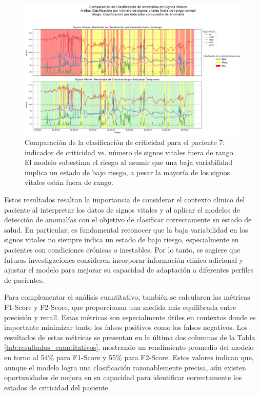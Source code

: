 \begin{figure}[H]
  \centering
  \includegraphics[width=\textwidth]{Images/comparacion_indicador_con_fuera_de_rango_paciente_7.png}
  \caption{Comparación de la clasificación de criticidad para el paciente 7: indicador de criticidad vs. número de signos vitales fuera de rango. El modelo subestima el riesgo al asumir que una baja variabilidad implica un estado de bajo riesgo, a pesar la mayoría de los signos vitales están fuera de rango.}

  \label{fig:comparacion_clasificacion_paciente7}
\end{figure}

Estos resultados resaltan la importancia de considerar el contexto clinico del paciente al interpretar los datos de signos vitales y al aplicar el modelos de detección de anomalías con el objetivo de clasificar correctamente su estado de salud. En particular, es fundamental reconocer que la baja variabilidad en los signos vitales no siempre indica un estado de bajo riesgo, especialmente en pacientes con condiciones crónicas o inestables. Por lo tanto, se sugiere que futuras investigaciones consideren incorporar información clínica adicional y ajustar el modelo para mejorar su capacidad de adaptación a diferentes perfiles de pacientes.

Para complementar el análisis cuantitativo, también se calcularon las métricas F1-Score y F2-Score, que proporcionan una medida más equilibrada entre precisión y recall. Estas métricas son especialmente útiles en contextos donde es importante minimizar tanto los falsos positivos como los falsos negativos. Los resultados de estas métricas se presentan en la última dos columnas de la Tabla \ref{tab:resultados_cuantitativos}, mostrando un rendimiento promedio del modelo en torno al 54\% para F1-Score y 55\% para F2-Score. Estos valores indican que, aunque el modelo logra una clasificación razonablemente precisa, aún existen oportunidades de mejora en su capacidad para identificar correctamente los estados de criticidad del paciente.

